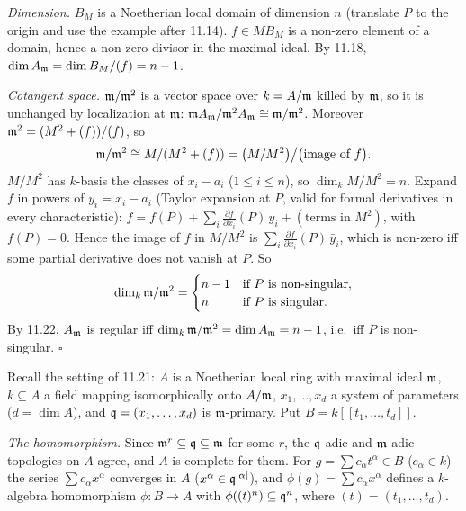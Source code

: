\documentclass[11pt]{article}
\begin{document}
\emph{Dimension.} $B_M$ is a Noetherian local domain of dimension $n$ (translate $P$ to the origin and use the example after 11.14). $f\in M B_M$ is a non-zero element of a domain, hence a non-zero-divisor in the maximal ideal. By 11.18, $\dim A_\mathfrak m=\dim B_M/(f)=n-1$.

\emph{Cotangent space.} $\mathfrak m/\mathfrak m^2$ is a vector space over $k=A/\mathfrak m$ killed by $\mathfrak m$, so it is unchanged by localization at $\mathfrak m$: $\mathfrak m A_\mathfrak m/\mathfrak m^2A_\mathfrak m\cong\mathfrak m/\mathfrak m^2$. Moreover $\mathfrak m^2=(M^2+(f))/(f)$, so
\[
\mathfrak m/\mathfrak m^2\cong M/(M^2+(f))=\bigl(M/M^2\bigr)\big/\bigl(\text{image of }f\bigr).
\]
$M/M^2$ has $k$-basis the classes of $x_i-a_i$ ($1\le i\le n$), so $\dim_kM/M^2=n$. Expand $f$ in powers of $y_i=x_i-a_i$ (Taylor expansion at $P$, valid for formal derivatives in every characteristic): $f=f(P)+\sum_i\frac{\partial f}{\partial x_i}(P)\,y_i+(\text{terms in }M^2)$, with $f(P)=0$. Hence the image of $f$ in $M/M^2$ is $\sum_i\frac{\partial f}{\partial x_i}(P)\,\bar y_i$, which is non-zero iff some partial derivative does not vanish at $P$. So
\[
\dim_k\mathfrak m/\mathfrak m^2=\begin{cases}n-1&\text{if }P\text{ is non-singular},\\ n&\text{if }P\text{ is singular.}\end{cases}
\]
By 11.22, $A_\mathfrak m$ is regular iff $\dim_k\mathfrak m/\mathfrak m^2=\dim A_\mathfrak m=n-1$, i.e.\ iff $P$ is non-singular. \hfill$\square$

\pf
Recall the setting of 11.21: $A$ is a Noetherian local ring with maximal ideal $\mathfrak m$, $k\subseteq A$ a field mapping isomorphically onto $A/\mathfrak m$, $x_1,\dots,x_d$ a system of parameters ($d=\dim A$), and $\mathfrak q=(x_1,\dots,x_d)$ is $\mathfrak m$-primary. Put $B=k[[t_1,\dots,t_d]]$.

\emph{The homomorphism.} Since $\mathfrak m^r\subseteq\mathfrak q\subseteq\mathfrak m$ for some $r$, the $\mathfrak q$-adic and $\mathfrak m$-adic topologies on $A$ agree, and $A$ is complete for them. For $g=\sum c_\alpha t^\alpha\in B$ ($c_\alpha\in k$) the series $\sum c_\alpha x^\alpha$ converges in $A$ ($x^\alpha\in\mathfrak q^{|\alpha|}$), and $\phi(g)=\sum c_\alpha x^\alpha$ defines a $k$-algebra homomorphism $\phi:B\to A$ with $\phi((t)^n)\subseteq\mathfrak q^n$, where $(t)=(t_1,\dots,t_d)$.
\end{document}
